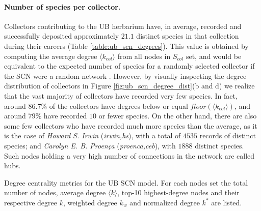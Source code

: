 \paragraph{Number of species per collector.}
Collectors contributing to the UB herbarium have, in average, recorded and successfully deposited approximately $21.1$ distinct species in that collection during their careers (Table \ref{table:ub_scn_degrees}). This value is obtained by computing the average degree $\langle k_{col} \rangle$ from all nodes in $S_{col}$ set, and would be equivalent to the expected number of species for a randomly selected collector if the SCN were a random network \cite{Albert2002}.
However, by visually inspecting the degree distribution of collectors in Figure \ref{fig:ub_scn_degree_dist}(b and d) we realize that the vast majority of collectors have recorded very few species. In fact, around $86.7\%$ of the collectors have degrees below or equal $floor(\langle k_{col} \rangle)$, and around $79\%$ have recorded $10$ or fewer species.
On the other hand, there are also some few collectors who have recorded much more species than the average, as it is the case of \textit{Howard S. Irwin} (\textit{irwin,hs}), with a total of $4535$ records of distinct species; and \textit{Carolyn E. B. Proença} (\textit{proenca,ceb}), with $1888$ distinct species. Such nodes holding a very high number of connections in the network are called hubs.

\begin{table}[t]
\caption[Degree centrality metrics for the UB SCN model.]{ Degree centrality metrics for the UB SCN model. For each nodes set the total number of nodes, average degree $\langle k \rangle$, top-10 highest-degree nodes and their respective degree $k$, weighted degree $k_w$ and normalized degree $k^*$ are listed.}
\begin{center}
	
\end{center}
\label{table:ub_scn_degrees}
\end{table}

